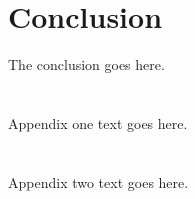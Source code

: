 \documentclass[journal]{IEEEtran}
\begin{document}




\section{Conclusion}
The conclusion goes here.



\appendices
\section{}
Appendix one text goes here.

\section{}
Appendix two text goes here.
\end{document}
